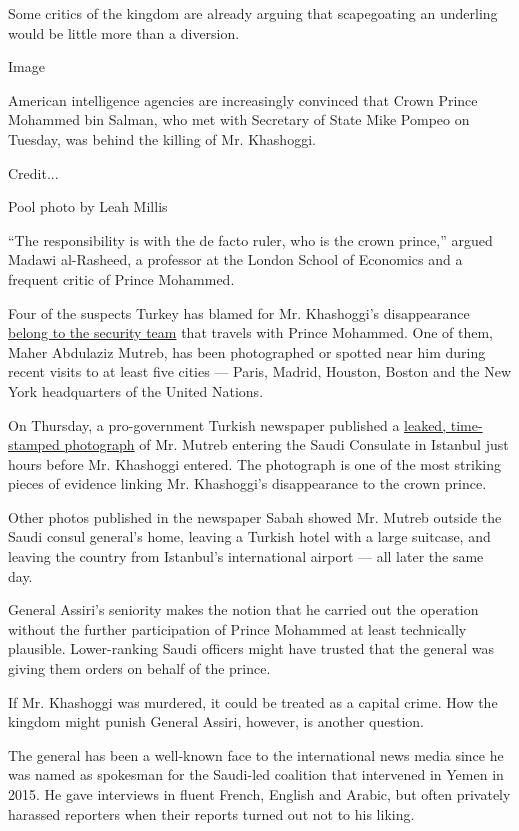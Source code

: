 Some critics of the kingdom are already arguing that scapegoating an
underling would be little more than a diversion.

Image

American intelligence agencies are increasingly convinced that Crown
Prince Mohammed bin Salman, who met with Secretary of State Mike Pompeo
on Tuesday, was behind the killing of Mr. Khashoggi.

Credit...

Pool photo by Leah Millis

``The responsibility is with the de facto ruler, who is the crown
prince,'' argued Madawi al-Rasheed, a professor at the London School of
Economics and a frequent critic of Prince Mohammed.

Four of the suspects Turkey has blamed for Mr. Khashoggi's disappearance
\href{https://www.nytimes.com/2018/10/16/world/middleeast/khashoggi-saudi-prince.html}{belong
to the security team} that travels with Prince Mohammed. One of them,
Maher Abdulaziz Mutreb, has been photographed or spotted near him during
recent visits to at least five cities --- Paris, Madrid, Houston, Boston
and the New York headquarters of the United Nations.

On Thursday, a pro-government Turkish newspaper published a
\href{https://www.nytimes.com/2018/10/18/world/middleeast/jamal-khashoggi-mohammed-bin-salman-turkey-saudi-arabia.html}{leaked,
time-stamped photograph} of Mr. Mutreb entering the Saudi Consulate in
Istanbul just hours before Mr. Khashoggi entered. The photograph is one
of the most striking pieces of evidence linking Mr. Khashoggi's
disappearance to the crown prince.

Other photos published in the newspaper Sabah showed Mr. Mutreb outside
the Saudi consul general's home, leaving a Turkish hotel with a large
suitcase, and leaving the country from Istanbul's international airport
--- all later the same day.

General Assiri's seniority makes the notion that he carried out the
operation without the further participation of Prince Mohammed at least
technically plausible. Lower-ranking Saudi officers might have trusted
that the general was giving them orders on behalf of the prince.

If Mr. Khashoggi was murdered, it could be treated as a capital crime.
How the kingdom might punish General Assiri, however, is another
question.

The general has been a well-known face to the international news media
since he was named as spokesman for the Saudi-led coalition that
intervened in Yemen in 2015. He gave interviews in fluent French,
English and Arabic, but often privately harassed reporters when their
reports turned out not to his liking.

